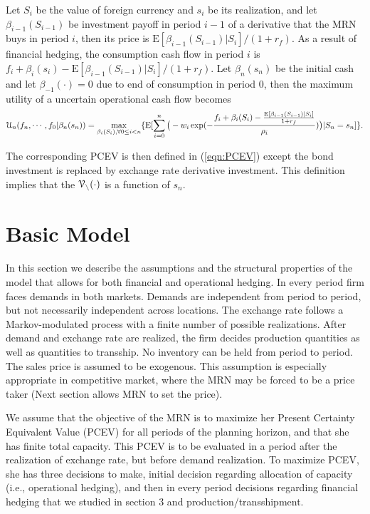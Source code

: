\documentclass[mnsc,nonblindrev,copyedit]{informs2_wz} %
\newcommand{\E}{\mathrm{E}}
\newcommand{\V}{\cal{V}}
\begin{document}
Let $S_i$ be the value of foreign currency and $s_i$ be its realization, and let $\beta_{i-1}(S_{i-1})$ be investment payoff in period $i-1$ of a derivative that the MRN buys in period $i$, then its price is $\E[\beta_{i-1}(S_{i-1})|S_i]/(1+r_f)$. As a result of financial hedging, the consumption cash flow in period $i$ is $f_i + \beta_{i}(s_i) - \E[\beta_{i-1} (S_{i-1})|S_i]/(1+r_f)$. Let $\beta_{n}(s_n)$ be the initial cash  and let $\beta_{-1}(\cdot)=0$ due to end of consumption in period $0$, then the maximum utility of a uncertain operational cash flow becomes
\begin{eqnarray} 
    \label{eqn:maxU-FH}
\mathcal{U}_n(f_{n},\cdots,f_0|\beta _{n}(s_n) )  =\max_{\beta_{i}(S_{i}), \forall 0\leq i< n} \{\E [\sum_{i=0}^n \big{(}-w_{i}\exp(-\frac{f_{i} + \beta_{i}(S_i)-\frac{\E[\beta_{i-1}(S_{i-1})|S_i]}{1+r_f}}{\rho_i})\big{)}  |S_n=s_n]\}.
\end{eqnarray}

The corresponding PCEV is then defined in (\ref{eqn:PCEV}) except the bond investment is replaced by exchange rate derivative investment. This definition implies that the $\V_n(\cdot)$ is a function of $s_n$. 





\section{Basic Model \label{sect:basicModel}}

In this section we describe the assumptions and the structural properties of the model that allows for both financial and operational hedging.  In every period firm faces demands in both markets.  Demands are independent from period to period, but not necessarily independent across locations.  The exchange rate follows a Markov-modulated process with a finite number of possible realizations.  After demand and exchange rate are realized, the firm decides production quantities as well as quantities to transship.  No inventory can be held from period to period.  The sales price is assumed to be exogenous.  This assumption is especially appropriate in competitive market, where the MRN may be forced to be a price taker (Next section allows MRN to set the price). 

We assume that the objective of the MRN is to maximize her Present Certainty Equivalent Value (PCEV) for all periods of the planning horizon, and that she has finite total capacity. This PCEV is to be evaluated in a period after the realization of exchange rate, but before demand realization.  To maximize PCEV, she has three decisions to make, initial decision regarding allocation of capacity (i.e., operational hedging), and then in every period decisions regarding financial hedging that we studied in section 3 and production/transshipment.
\end{document}
